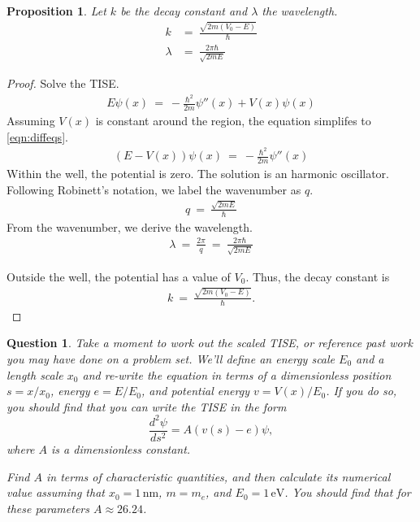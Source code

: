 \documentclass{article}
\numberwithin{equation}{section}
\newtheorem{proposition}{Proposition}[section]
\newtheorem{question}{Question}[section]
\begin{document}
\begin{proposition}
    Let $k$ be the decay constant and $\lambda$ the 
    wavelength. 
    \begin{align}
        k & = \ \frac{\sqrt{2m(V_0 - E)}}{\hbar} \\ 
        \lambda & = \  \frac{2 \pi \hbar}{\sqrt{2 m E}}
    \end{align}
\end{proposition}

\begin{proof} 
    Solve the TISE. 
    \begin{align}
        E \psi(x) \ = \ -\frac {\hbar^2}{2m} \psi''(x) + V(x) \psi(x)
    \end{align}
    Assuming $V(x)$ is constant around the region, the 
    equation simplifes to \eqref{eqn:diffeqs}. 
    \begin{align}
        (E - V(x)) \psi(x) \ = \ -\frac{\hbar^2}{2m} \psi''(x)
    \end{align}
    Within the well, the potential is zero. The solution is 
    an harmonic oscillator. Following Robinett's notation, 
    we label the wavenumber as $q$. 
    \begin{align}
        q \ = \ \frac {\sqrt{2mE}}{\hbar}
    \end{align}
    From the wavenumber, we derive the wavelength. 
    \begin{align}
        \lambda \ = \ \frac {2\pi} q \ = \ \frac{2 \pi \hbar}{\sqrt{2 m E}}
    \end{align}

    Outside the well, the potential has a value of $V_0$. Thus, 
    the decay constant is 
    \begin{align}
        k \ = \ \frac{\sqrt{2m(V_0 - E)}}{\hbar}. 
    \end{align}
\end{proof}

\begin{question}
Take a moment to work out the scaled TISE, or reference past work you may have done on a problem set. We’ll define an energy scale $E_0$ and a length scale $x_0$ and re-write the equation in terms of a dimensionless position $s = x / x_0$, energy $e = E / E_0$, and potential energy $v = V(x) / E_0$. If you do so, you should find that you can write the TISE in the form
\begin{equation}\label{eqn:dimensionless}
    \frac{d^2 \psi}{ds^2} = A (v(s) - e) \psi,
\end{equation}
where $A$ is a dimensionless constant. 

Find $A$ in terms of characteristic quantities, and then calculate its numerical value assuming that $x_0 = 1 \, \text{nm}$, $m = m_e$, and $E_0 = 1 \, \text{eV}$. You should find that for these parameters $A \approx 26.24$.
\end{question}
\end{document}

